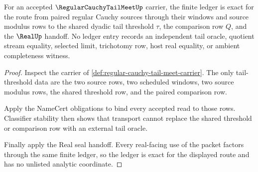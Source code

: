 \begin{theorem}
\label{thm:regular-cauchy-tail-meet-ledger-exactness}
For an accepted $\RegularCauchyTailMeetUp$ carrier, the finite ledger is exact for the route from paired regular Cauchy sources through their windows and source modulus rows to the shared dyadic tail threshold $\tau$, the comparison row $Q$, and the $\RealUp$ handoff. No ledger entry records an independent tail oracle, quotient stream equality, selected limit, trichotomy row, host real equality, or ambient completeness witness.
\end{theorem}
\begin{proof}
Inspect the carrier of \autoref{def:regular-cauchy-tail-meet-carrier}. The only tail-threshold data are the two source rows, two scheduled windows, two source modulus rows, the shared threshold row, and the paired comparison row.

Apply the NameCert obligations to bind every accepted read to those rows. Classifier stability then shows that transport cannot replace the shared threshold or comparison row with an external tail oracle.

Finally apply the Real seal handoff. Every real-facing use of the packet factors through the same finite ledger, so the ledger is exact for the displayed route and has no unlisted analytic coordinate.
\end{proof}


